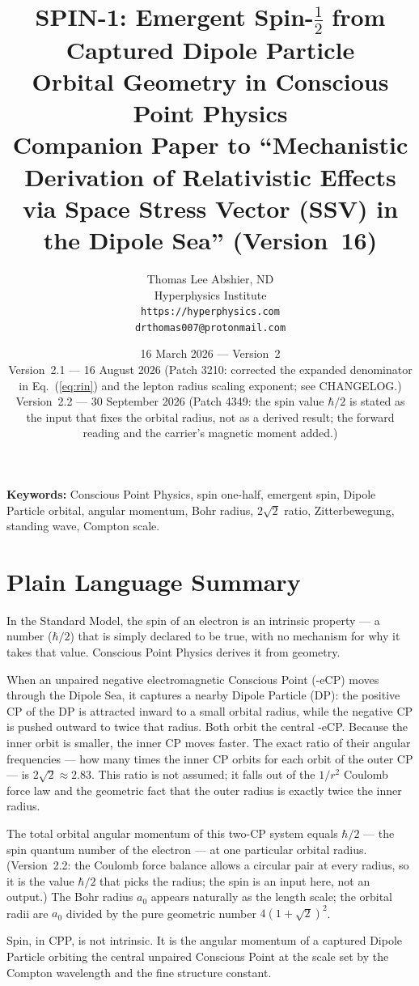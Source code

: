 \documentclass[12pt]{article}
\title{\textbf{SPIN-1: Emergent Spin-$\tfrac{1}{2}$ from Captured Dipole Particle\\
Orbital Geometry in Conscious Point Physics}\\[6pt]
{\large Companion Paper to ``Mechanistic Derivation of Relativistic Effects\\
via Space Stress Vector (SSV) in the Dipole Sea'' (Version~16)}}
\author{Thomas Lee Abshier, ND\\
Hyperphysics Institute\\
\texttt{https://hyperphysics.com}\\
\texttt{drthomas007@protonmail.com}}
\date{16 March 2026 --- Version~2\\[2pt]
{\small Version~2.1 --- 16 August 2026 (Patch 3210: corrected the
expanded denominator in Eq.~(\ref{eq:rin}) and the lepton radius
scaling exponent; see CHANGELOG.)}\\[2pt]
{\small Version~2.2 --- 30 September 2026 (Patch 4349: the spin value $\hbar/2$ is stated as the input that fixes the orbital radius, not as a derived result; the forward reading and the carrier's magnetic moment added.)}}
\newcommand{\aBohr}{a_0}
\begin{document}
\maketitle

\noindent\textbf{Keywords:} Conscious Point Physics, spin one-half,
emergent spin, Dipole Particle orbital, angular momentum, Bohr radius,
$2\sqrt{2}$ ratio, Zitterbewegung, standing wave, Compton scale.

\section*{Plain Language Summary}

In the Standard Model, the spin of an electron is an intrinsic property
--- a number ($\hbar/2$) that is simply declared to be true, with no
mechanism for why it takes that value.  Conscious Point Physics derives
it from geometry.

When an unpaired negative electromagnetic Conscious Point (-eCP) moves
through the Dipole Sea, it captures a nearby Dipole Particle (DP): the
positive CP of the DP is attracted inward to a small orbital radius,
while the negative CP is pushed outward to twice that radius.  Both
orbit the central -eCP.  Because the inner orbit is smaller, the inner
CP moves faster.  The exact ratio of their angular frequencies --- how
many times the inner CP orbits for each orbit of the outer CP --- is
$2\sqrt{2} \approx 2.83$.  This ratio is not assumed; it falls out of
the $1/r^2$ Coulomb force law and the geometric fact that the outer
radius is exactly twice the inner radius.

The total orbital angular momentum of this two-CP system equals
$\hbar/2$ --- the spin quantum number of the electron --- at one particular
orbital radius. (Version~2.2: the Coulomb force balance allows a circular
pair at every radius, so it is the value $\hbar/2$ that picks the radius;
the spin is an input here, not an output.)  The Bohr radius $\aBohr$
appears naturally as the length scale; the orbital radii are $\aBohr$
divided by the pure geometric number $4(1+\sqrt{2})^2$.

Spin, in CPP, is not intrinsic.  It is the angular momentum of a
captured Dipole Particle orbiting the central unpaired Conscious Point
at the scale set by the Compton wavelength and the fine structure
constant.
\end{document}
